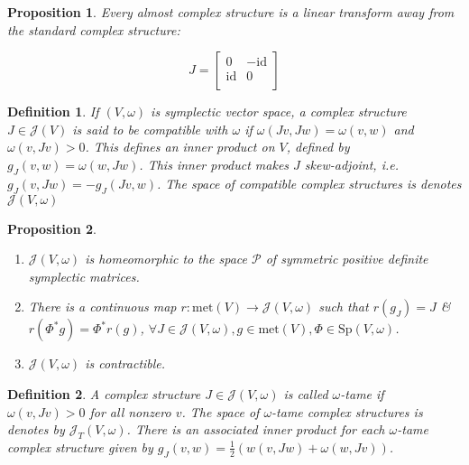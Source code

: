 \documentclass{article}
\newtheorem{defn}{Definition}
\newtheorem{prop}{Proposition}
\begin{document}
\begin{prop}

Every almost complex structure is a linear transform away from the standard complex structure:

\[
J = \begin{bmatrix}
     0 & -\mathrm{id} \\
     \mathrm{id} & 0 \\
\end{bmatrix}
\]

\end{prop}

\begin{defn}

If $(V,\omega)$ is symplectic vector space, a complex structure $J \in \mathcal{J}(V)$ is said to be compatible with $\omega$ if $\omega(Jv, Jw) = \omega(v,w)$ and $\omega(v,Jv) > 0$. This defines an inner product on $V$, defined by $g_J(v,w) = \omega(w,Jw)$. This inner product makes $J$ skew-adjoint, i.e. $g_J(v,Jw) = - g_J(Jv, w)$. The space of compatible complex structures is denotes $\mathcal{J}(V,\omega)$
\end{defn}

\begin{prop}

\begin{enumerate}
    \item $\mathcal{J}(V,\omega)$ is homeomorphic to the space $\mathcal{P}$ of symmetric positive definite symplectic matrices.
    \item There is a continuous map $r:\text{met}(V) \to \mathcal{J}(V,\omega)$ such that $r(g_J) = J$ \& $r(\Phi^* g) = \Phi^* r(g)$, $\forall J \in \mathcal{J}(V,\omega), g \in \text{met}(V), \Phi \in \text{Sp}(V,\omega)$.
    \item $\mathcal{J}(V,\omega)$ is contractible.
    
    
\end{enumerate}

\end{prop}

\begin{defn}

A complex structure $J \in \mathcal{J}(V,\omega)$ is called $\omega$-tame if $\omega(v,Jv) > 0$ for all nonzero $v$. The space of $\omega$-tame complex structures is denotes by $\mathcal{J}_T(V, \omega)$. There is an associated inner product for each $\omega$-tame complex structure given by $g_J(v,w) = \frac{1}{2}(w(v,Jw) + \omega(w,Jv))$.

\end{defn}
\end{document}
